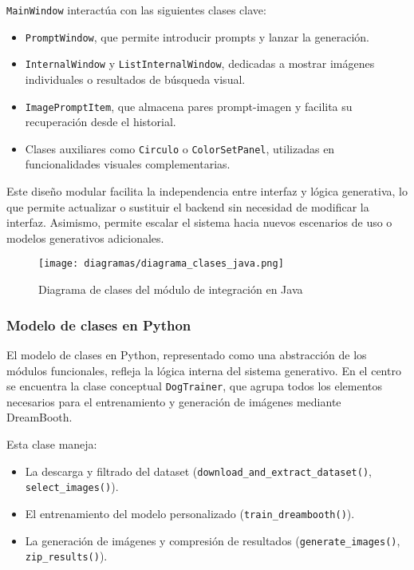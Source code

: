 \texttt{MainWindow} interactúa con las siguientes clases clave:
\begin{itemize}
    \item \texttt{PromptWindow}, que permite introducir prompts y lanzar la generación.
    \item \texttt{InternalWindow} y \texttt{ListInternalWindow}, dedicadas a mostrar imágenes individuales o resultados de búsqueda visual.
    \item \texttt{ImagePromptItem}, que almacena pares prompt-imagen y facilita su recuperación desde el historial.
    \item Clases auxiliares como \texttt{Circulo} o \texttt{ColorSetPanel}, utilizadas en funcionalidades visuales complementarias.
\end{itemize}

Este diseño modular facilita la independencia entre interfaz y lógica generativa, lo que permite actualizar o sustituir el backend sin necesidad de modificar la interfaz. Asimismo, permite escalar el sistema hacia nuevos escenarios de uso o modelos generativos adicionales.

\begin{figure}[H]
    \centering
    \texttt{[image: diagramas/diagrama\_clases\_java.png]}
    \caption{Diagrama de clases del módulo de integración en Java}
    \label{fig:clases-java}
\end{figure}

\subsubsection{Modelo de clases en Python}

El modelo de clases en Python, representado como una abstracción de los módulos funcionales, refleja la lógica interna del sistema generativo. En el centro se encuentra la clase conceptual \texttt{DogTrainer}, que agrupa todos los elementos necesarios para el entrenamiento y generación de imágenes mediante DreamBooth.

Esta clase maneja:
\begin{itemize}
\item La descarga y filtrado del dataset (\texttt{download\_and\_extract\_dataset()}, \texttt{select\_images()}).
\item El entrenamiento del modelo personalizado (\texttt{train\_dreambooth()}).
\item La generación de imágenes y compresión de resultados (\texttt{generate\_images()}, \texttt{zip\_results()}).
\end{itemize}

